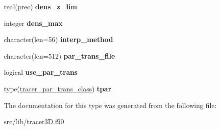 \begin{DoxyCompactItemize}
\mbox{\label{structtracer3d_1_1tracer__par__class_aadbc554683f144875a2a0dd60baa5450}} 
real(prec) {\bfseries dens\+\_\+z\+\_\+lim}
\item 
\mbox{\label{structtracer3d_1_1tracer__par__class_a7617f9085e28d93250ebed7ad6007869}} 
integer {\bfseries dens\+\_\+max}
\item 
\mbox{\label{structtracer3d_1_1tracer__par__class_a33c8edd729f2f4c19571ee04368be4e0}} 
character(len=56) {\bfseries interp\+\_\+method}
\item 
\mbox{\label{structtracer3d_1_1tracer__par__class_a502b51714ceeed6e028b0eaea8fc41b4}} 
character(len=512) {\bfseries par\+\_\+trans\+\_\+file}
\item 
\mbox{\label{structtracer3d_1_1tracer__par__class_a9bb9fd6b9779087e2db2805a803ac736}} 
logical {\bfseries use\+\_\+par\+\_\+trans}
\item 
\mbox{\label{structtracer3d_1_1tracer__par__class_a4486f0959101435f0fdeb1c845d4bbf4}} 
type(\mbox{\hyperlink{structtracer3d_1_1tracer__par__trans__class}{tracer\+\_\+par\+\_\+trans\+\_\+class}}) {\bfseries tpar}
\end{DoxyCompactItemize}


The documentation for this type was generated from the following file\+:\begin{DoxyCompactItemize}
\item 
src/lib/tracer3\+D.\+f90\end{DoxyCompactItemize}

